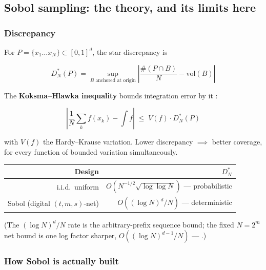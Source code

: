 \subsection{Sobol sampling: the theory, and its limits here}
\label{sec:sobol}

\subsubsection{Discrepancy}
\label{sec:discrepancy}

For $P = \{x_1\ldots x_N\} \subset [0,1]^d$, the star discrepancy is

\begin{equation*}
D^*_N(P) = \sup_{B \text{ anchored at origin}}
  \left|\frac{\#(P \cap B)}{N} - \mathrm{vol}(B)\right|
\end{equation*}

The \textbf{Koksma--Hlawka inequality} bounds integration error by it
\citep{niederreiter1992,owen2021}:

\begin{equation*}
\left|\frac{1}{N}\sum_k f(x_k) - \int f\right| \;\leq\; V(f)\cdot D^*_N(P)
\end{equation*}

with $V(f)$ the Hardy--Krause variation. Lower discrepancy $\implies$ better
coverage, for every function of bounded variation simultaneously.

\begin{center}
\small
\begin{tabularx}{\textwidth}{@{}R{0.6} R{1.4}@{}}
\toprule
\textbf{Design} & \textbf{$D^*_N$} \\
\midrule
i.i.d.\ uniform &
  $O(N^{-1/2}\sqrt{\log\log N})$ --- probabilistic \citep{chung1949} \\
Sobol (digital $(t,m,s)$-net) &
  $O((\log N)^d / N)$ --- deterministic
  \citep{sobol1967,niederreiter1992} \\
\bottomrule
\end{tabularx}
\end{center}

(The $(\log N)^d/N$ rate is the arbitrary-prefix sequence bound; the fixed
$N = 2^m$ net bound is one log factor sharper, $O((\log N)^{d-1}/N)$ ---
\citealt{owen2022}.)

\subsubsection{How Sobol is actually built}
\label{sec:sobolbuild}

